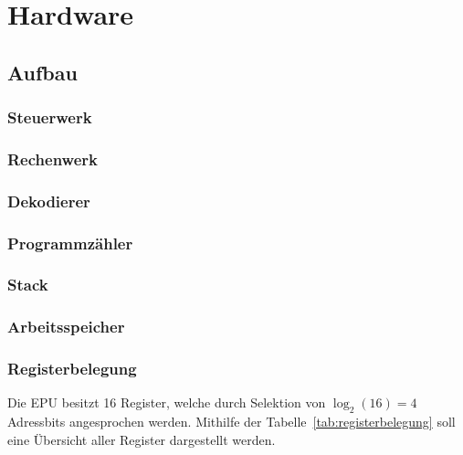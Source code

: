 \chapter{Hardware}
\label{c:hardwar}
\section{Aufbau}
\subsection{Steuerwerk}
\pagebreak
\subsection{Rechenwerk}
\pagebreak
\subsection{Dekodierer}
\pagebreak
\subsection{Programmzähler}
\pagebreak
\subsection{Stack}
\pagebreak
\subsection{Arbeitsspeicher}
\pagebreak
\subsection{Registerbelegung}
Die \ac{EPU} besitzt 16 Register, welche durch Selektion von $\log_2(16) = 4$
Adressbits angesprochen werden. Mithilfe der Tabelle~\ref{tab:registerbelegung}
soll eine Übersicht aller Register dargestellt werden.

